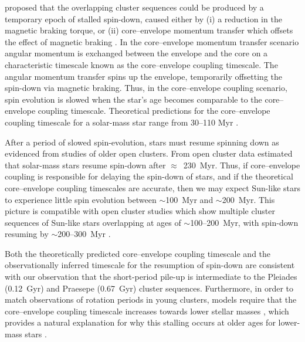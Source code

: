 \documentclass[linenumbers,tighten,trackchanges,twocolumn]{aastex631}
\begin{document}
\citet{Curtis2019a, Curtis2020} proposed that the overlapping cluster sequences could be produced by a temporary epoch of stalled spin-down, caused either by (i) a reduction in the magnetic braking torque, or (ii) core–envelope momentum transfer which offsets the effect of magnetic braking \citep[e.g.][]{MacGregor1991}. In the core–envelope momentum transfer scenario angular momentum is exchanged between the envelope and the core on a characteristic timescale known as the core–envelope coupling timescale. The angular momentum transfer spins up the envelope, temporarily offsetting the spin-down via magnetic braking. Thus, in the core–envelope coupling scenario, spin evolution is slowed when the star's age becomes comparable to the core–envelope coupling timescale. Theoretical predictions for the core–envelope coupling timescale for a solar-mass star range from 30--110 Myr \citep{Bouvier2008, IrwinBouvier2009, Denissenkov2010, GalletBouvier2015, Lanzafame2015, Somers2016, Spada2020}. 

{\color{red} After a period of slowed spin-evolution, stars must resume spinning down as evidenced from studies of older open clusters. From open cluster data \citet{Curtis2020} estimated that solar-mass stars resume spin-down after $\approx$~230~Myr. Thus, if core–envelope coupling is responsible for delaying the spin-down of stars, and if the theoretical core–envelope coupling timescales are accurate, then we may expect Sun-like stars to experience little spin evolution between $\sim$100~Myr and $\sim$200~Myr. This picture is compatible with open cluster studies which show multiple cluster sequences of Sun-like stars overlapping at ages of $\sim$100--200~Myr, with spin-down resuming by $\sim$200--300~Myr \citep{Fritzewski2020,Fritzewski2021}.}

Both the theoretically predicted core–envelope coupling timescale and the observationally inferred timescale for the resumption of spin-down are consistent with our observation that the short-period pile-up is intermediate to the Pleiades (0.12~Gyr) and Praesepe (0.67~Gyr) cluster sequences. Furthermore, in order to match observations of rotation periods in young clusters, models require that the core–envelope coupling timescale increases towards lower stellar masses \citep[e.g.][]{Irwin2007, Denissenkov2010, GalletBouvier2015}, which provides a natural explanation for why this stalling occurs at older ages for lower-mass stars \citep{Curtis2020}. 
\end{document}
